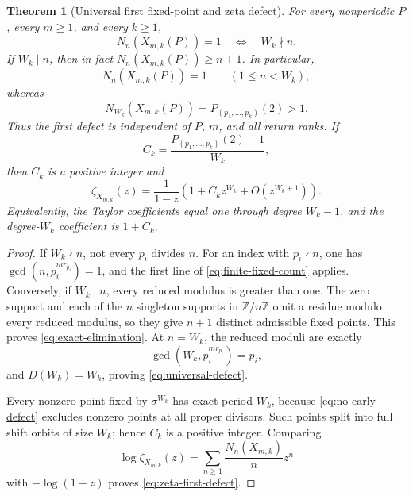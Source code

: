 \documentclass[11pt]{article}
\numberwithin{equation}{section}
\newtheorem{theorem}{Theorem}[section]
\theoremstyle{remark}
\newcommand{\Z}{\mathbb Z}
\begin{document}
\begin{theorem}[Universal first fixed-point and zeta defect]
\label{thm:first-defect}
For every nonperiodic $P$, every $m\ge1$, and every $k\ge1$,
\begin{equation}
 N_n(X_{m,k}(P))=1
 \quad\Longleftrightarrow\quad
 W_k\nmid n.
 \label{eq:exact-elimination}
\end{equation}
If $W_k\mid n$, then in fact $N_n(X_{m,k}(P))\ge n+1$.
In particular,
\begin{equation}
 N_n(X_{m,k}(P))=1
 \qquad(1\le n<W_k),
 \label{eq:no-early-defect}
\end{equation}
whereas
\begin{equation}
 N_{W_k}(X_{m,k}(P))
 =P_{(p_1,\ldots,p_k)}(2)>1.
 \label{eq:universal-defect}
\end{equation}
Thus the first defect is independent of $P$, $m$, and all return ranks.
If
\begin{equation}
 C_k=\frac{P_{(p_1,\ldots,p_k)}(2)-1}{W_k},
 \label{eq:primitive-defect}
\end{equation}
then $C_k$ is a positive integer and
\begin{equation}
 \zeta_{X_{m,k}}(z)
 =\frac1{1-z}\left(1+C_kz^{W_k}+O(z^{W_k+1})\right).
 \label{eq:zeta-first-defect}
\end{equation}
Equivalently, the Taylor coefficients equal one through degree $W_k-1$,
and the degree-$W_k$ coefficient is $1+C_k$.
\end{theorem}

\begin{proof}
If $W_k\nmid n$, not every $p_i$ divides $n$.  For an index with
$p_i\nmid n$, one has
\(
\gcd(n,p_i^{m r_{p_i}})=1
\), and the first line of \eqref{eq:finite-fixed-count} applies.  Conversely,
if $W_k\mid n$, every reduced modulus is greater than one.  The zero support
and each of the $n$ singleton supports in $\Z/n\Z$ omit a residue modulo
every reduced modulus, so they give $n+1$ distinct admissible fixed points.
This proves \eqref{eq:exact-elimination}.  At
$n=W_k$, the reduced moduli are exactly
\[
 \gcd(W_k,p_i^{m r_{p_i}})=p_i,
\]
and $D(W_k)=W_k$, proving \eqref{eq:universal-defect}.

Every nonzero point fixed by $\sigma^{W_k}$ has exact period $W_k$,
because \eqref{eq:no-early-defect} excludes nonzero points at all proper
divisors.  Such points split into full shift orbits of size $W_k$; hence
$C_k$ is a positive integer.  Comparing
\[
 \log\zeta_{X_{m,k}}(z)=\sum_{n\ge1}\frac{N_n(X_{m,k})}{n}z^n
\]
with $-\log(1-z)$ proves \eqref{eq:zeta-first-defect}.
\end{proof}
\end{document}
